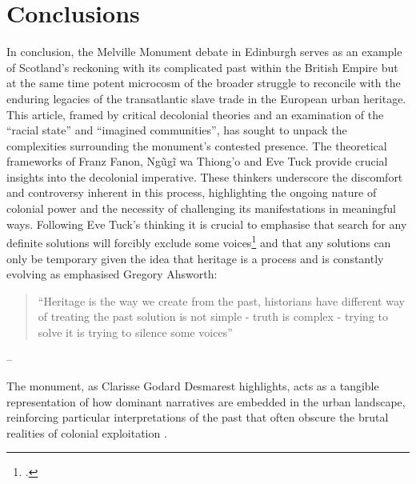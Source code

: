 \documentclass{scrartcl}
\renewcommand{\cite}{\parencite}
\begin{document}
\section{Conclusions}

In conclusion, the Melville Monument debate in Edinburgh serves as an example of Scotland's reckoning with its complicated past within the British Empire but at the same time potent microcosm of the broader struggle to reconcile with the enduring legacies of the transatlantic slave trade in the European urban heritage. This article, framed by critical decolonial theories and an examination of the ``racial state'' and ``imagined communities'', has sought to unpack the complexities surrounding the monument's contested presence. The theoretical frameworks of Franz Fanon, Ngũgĩ wa Thiong'o and Eve Tuck provide crucial insights into the decolonial imperative. These thinkers underscore the discomfort and controversy inherent in this process, highlighting the ongoing nature of colonial power and the necessity of challenging its manifestations in meaningful ways.
Following Eve Tuck's thinking it is crucial to emphasise that search for any definite solutions will forcibly exclude some voices\footcite["Actually, we argue, attending to what is irreconcilable within settler colonial relations and what is incommensurable between decolonizing projects and other social justice projects will help to reduce the frustration of attempts at solidarity; but the attention won’t get anyone off the hook from the hard, unsettling work of decolonization. Thus, we also include a discussion of interruptions that unsettle innocence and recognize incommensurability."
][p.4]{eve_tuck_k_wayne_yang_decolonization_2012} and that any solutions can only be temporary given the idea that heritage is a process and is constantly evolving as emphasised Gregory Ahsworth: 

\begin{quotation}
``Heritage is the way we create from the past, historians have different way of treating the past solution is not simple - truth is complex - trying to solve it is trying to silence some voices'' 
\end{quotation}
\begin{flushright}
-- \cite{gregory_ashworth_interview_2008} 
\end{flushright}

The monument, as Clarisse Godard Desmarest highlights, acts as a tangible representation of how dominant narratives are embedded in the urban landscape, reinforcing particular interpretations of the past that often obscure the brutal realities of colonial exploitation \cite{godard_2018}.
\end{document}
